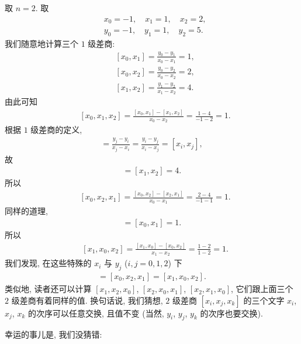 \begin{example}
    取 $n = 2$. 取
    \begin{align*}
         & x_0 = -1, \quad x_1 = 1, \quad x_2 = 2, \\
         & y_0 = -1, \quad y_1 = 1, \quad y_2 = 5.
    \end{align*}
    我们随意地计算三个 $1$ 级差商:
    \begin{align*}
         & [x_0, x_1] = \frac{y_0 - y_1}{x_0 - x_1} = 1, \\
         & [x_0, x_2] = \frac{y_0 - y_2}{x_0 - x_2} = 2, \\
         & [x_1, x_2] = \frac{y_1 - y_2}{x_1 - x_2} = 4.
    \end{align*}
    由此可知
    \begin{align*}
         & [x_0, x_1, x_2] = \frac{[x_0, x_1] - [x_1, x_2]}{x_0 - x_2} = \frac{1 - 4}{-1 - 2} = 1.
    \end{align*}
    根据 $1$ 级差商的定义,
    \begin{align*}
        [x_j, x_i] = \frac{y_j - y_i}{x_j - x_i} = \frac{y_i - y_j}{x_i - x_j} = [x_i, x_j],
    \end{align*}
    故
    \begin{align*}
        [x_2, x_1] = [x_1, x_2] = 4.
    \end{align*}
    所以
    \begin{align*}
         & [x_0, x_2, x_1] = \frac{[x_0, x_2] - [x_2, x_1]}{x_0 - x_1} = \frac{2 - 4}{-1 - 1} = 1.
    \end{align*}
    同样的道理,
    \begin{align*}
        [x_1, x_0] = [x_0, x_1] = 1.
    \end{align*}
    所以
    \begin{align*}
         & [x_1, x_0, x_2] = \frac{[x_1, x_0] - [x_0, x_2]}{x_1 - x_2} = \frac{1 - 2}{1 - 2} = 1.
    \end{align*}
    我们发现, 在这些特殊的 $x_i$ 与 $y_j$ ($i,j = 0,1,2$) 下
    \begin{align*}
        [x_0, x_1, x_2] = [x_0, x_2, x_1] = [x_1, x_0, x_2].
    \end{align*}
    类似地, 读者还可以计算 $[x_1, x_2, x_0]$, $[x_2, x_0, x_1]$, $[x_2, x_1, x_0]$, 它们跟上面三个 $2$ 级差商有着同样的值. 换句话说, 我们猜想, $2$ 级差商 $[x_i, x_j, x_k]$ 的三个文字 $x_i$, $x_j$, $x_k$ 的次序可以任意交换, 且值不变 (当然, $y_i$, $y_j$, $y_k$ 的次序也要交换).
\end{example}

幸运的事儿是, 我们没猜错:

